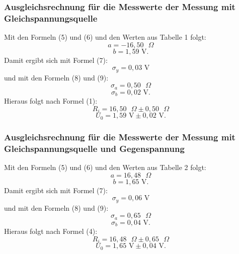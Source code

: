 \subsubsection{Ausgleichsrechnung für die Messwerte der Messung mit Gleichspannungsquelle}
Mit den Formeln (5) und (6) und den Werten aus Tabelle 1 folgt:
\begin{displaymath}
	a=-16,50\text{ }\Omega
\end{displaymath}
\begin{displaymath}
	b=1,59\text{ V.}
\end{displaymath}
Damit ergibt sich mit Formel (7):
\begin{displaymath}
	\sigma_y=0,03\text{ V}
\end{displaymath}
und mit den Formeln (8) und (9):
\begin{displaymath}
	\sigma_a=0,50\text{ }\Omega
\end{displaymath}
\begin{displaymath}
	\sigma_b=0,02\text{ V.}
\end{displaymath}
Hieraus folgt nach Formel (1):
\begin{displaymath}
	R_i=16,50\text{ }\Omega\pm 0,50\text{ }\Omega
\end{displaymath}
\begin{displaymath}
	U_0=1,59\text{ V}\pm 0,02\text{ V.}
\end{displaymath}

\subsubsection{Ausgleichsrechnung für die Messwerte der Messung mit Gleichspannungsquelle und Gegenspannung}

Mit den Formeln (5) und (6) und den Werten aus Tabelle 2 folgt:
\begin{displaymath}
a=16,48\text{ }\Omega
\end{displaymath}
\begin{displaymath}
b=1,65\text{ V.}
\end{displaymath}
Damit ergibt sich mit Formel (7):
\begin{displaymath}
\sigma_y=0,06\text{ V}
\end{displaymath}
und mit den Formeln (8) und (9):
\begin{displaymath}
\sigma_a=0,65\text{ }\Omega
\end{displaymath}
\begin{displaymath}
\sigma_b=0,04\text{ V.}
\end{displaymath}
Hieraus folgt nach Formel (4):
\begin{displaymath}
R_i=16,48\text{ }\Omega\pm 0,65\text{ }\Omega
\end{displaymath}
\begin{displaymath}
U_0=1,65\text{ V}\pm 0,04\text{ V.}
\end{displaymath}

